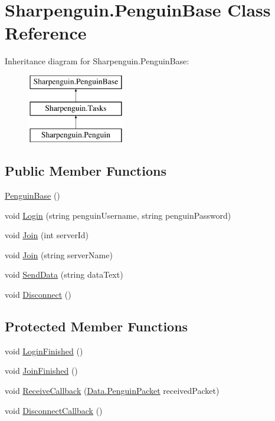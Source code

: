 \hypertarget{classSharpenguin_1_1PenguinBase}{\section{Sharpenguin.\-Penguin\-Base Class Reference}
\label{classSharpenguin_1_1PenguinBase}
}
Inheritance diagram for Sharpenguin.\-Penguin\-Base\-:\begin{figure}[H]
\begin{center}
\leavevmode
\includegraphics[height=3.000000cm]{classSharpenguin_1_1PenguinBase}
\end{center}
\end{figure}
\subsection*{Public Member Functions}
\begin{DoxyCompactItemize}
\item 
\hyperlink{classSharpenguin_1_1PenguinBase_abae69c0be10d8de6f6f852a5a9820c44}{Penguin\-Base} ()
\item 
void \hyperlink{classSharpenguin_1_1PenguinBase_a5447c51dc7c4f75091e9330e53f11213}{Login} (string penguin\-Username, string penguin\-Password)
\item 
void \hyperlink{classSharpenguin_1_1PenguinBase_a0ae2d038b4a98c1f2f121a3e3cd09a45}{Join} (int server\-Id)
\item 
void \hyperlink{classSharpenguin_1_1PenguinBase_a71a78e2b71d95bac92e9ad78d4924600}{Join} (string server\-Name)
\item 
void \hyperlink{classSharpenguin_1_1PenguinBase_a264ccadc06dccb3ad1812e6ce3ac5a44}{Send\-Data} (string data\-Text)
\item 
void \hyperlink{classSharpenguin_1_1PenguinBase_a1c56da96688962cc6db870fad34b9e62}{Disconnect} ()
\end{DoxyCompactItemize}
\subsection*{Protected Member Functions}
\begin{DoxyCompactItemize}
\item 
void \hyperlink{classSharpenguin_1_1PenguinBase_aa6a126810f26f0b1d85b8c6e35eed5c9}{Login\-Finished} ()
\item 
void \hyperlink{classSharpenguin_1_1PenguinBase_a64a4a3cd550fd49156f9ed5fbd1836ed}{Join\-Finished} ()
\item 
void \hyperlink{classSharpenguin_1_1PenguinBase_a0d866e6fe167c36721fc282cb36d9d07}{Receive\-Callback} (\hyperlink{classSharpenguin_1_1Data_1_1PenguinPacket}{Data.\-Penguin\-Packet} received\-Packet)
\item 
void \hyperlink{classSharpenguin_1_1PenguinBase_a06facd0f0f753fa79596ae31a6811a86}{Disconnect\-Callback} ()
\end{DoxyCompactItemize}
